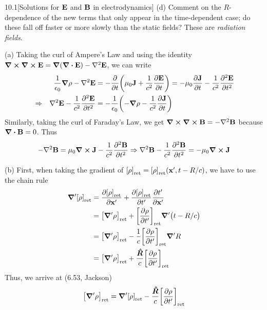 \documentclass[12pt]{article}
\newcommand{\ret}[1]{\qty[#1]_\text{ret}}
\newcommand{\Rhat}{\bm{\hat{R}}}
\begin{document}
\begin{problem}{10.1}[Solutions for $\vb{E}$ and $\vb{B}$ in electrodynamics]
(d) Comment on the $R$-dependence of the new terms that only appear in the
time-dependent case; do these fall off faster or more slowly than the static
fields? These are \textit{radiation fields}.
\begin{solution}
(a) Taking the curl of Ampere's Law and using the identity
$\curl{\vb{\curl\vb{E}}}=\grad\qty(\div{\vb{E}})-\laplacian\vb{E}$, we can
write
\begin{align}
    &&\frac1{\epsilon_0}\grad\rho-\laplacian\vb{E}
    &=-\frac{\partial}{\partial
    t}\qty(\mu_0\vb{J}+\frac1{c^2}\frac{\partial\vb{E}}{\partial t})
    =-\mu_0\frac{\partial\vb{J}}{\partial
    t}-\frac1{c^2}\frac{\partial^2\vb{E}}{\partial t^2}\notag\\
    &\Rightarrow&
    \laplacian\vb{E}-\frac1{c^2}\frac{\partial^2\vb{E}}{\partial t^2}
    &=-\frac1{\epsilon_0}\qty(-\grad\rho-\frac1{c^2}\frac{\partial\vb{J}}{\partial
    t})
\end{align}
Similarly, taking the curl of Faraday's Law, we get
$\curl{\curl{\vb{B}}}=-\laplacian\vb{B}$ because $\div{\vb{B}}=0$. Thus
\begin{equation}
    -\laplacian\vb{B}=\mu_0\curl\vb{J}-\frac1{c^2}\frac{\partial^2\vb{B}}{\partial
    t^2}\Rightarrow
    \laplacian\vb{B}-\frac1{c^2}\frac{\partial^2\vb{B}}{\partial t^2}
    =-\mu_0\curl{\vb{J}}
\end{equation}

(b) First, when taking the gradient of $\ret\rho=\ret\rho(\vb{x}',t-R /c)$, we
have to use the chain rule
\begin{align}
    \grad'\ret\rho
    &=\frac{\partial\ret\rho}{\partial\vb{x}'}+\frac{\partial\ret\rho}{\partial
    t'}\frac{\partial t'}{\partial \vb{x}'}\notag\\
    &=\ret{\grad'\rho}+\ret{\frac{\partial\rho}{\partial
    t'}}\grad'\qty(t-R/c)\notag\\
    &=\ret{\grad'\rho}-\frac1c\ret{\frac{\partial\rho}{\partial
    t'}}\grad'R\notag\\
    &=\ret{\grad'\rho}+\frac{\Rhat}{c}\ret{\frac{\partial\rho}{\partial t'}}
\end{align}
Thus, we arrive at (6.53, Jackson)
\begin{equation}
    \ret{\grad'\rho}=\grad'\ret{\rho}-\frac{\Rhat}{c}\ret{\frac{\partial\rho}{\partial
    t'}} 
\end{equation}


\end{solution}
\end{problem}
\end{document}
